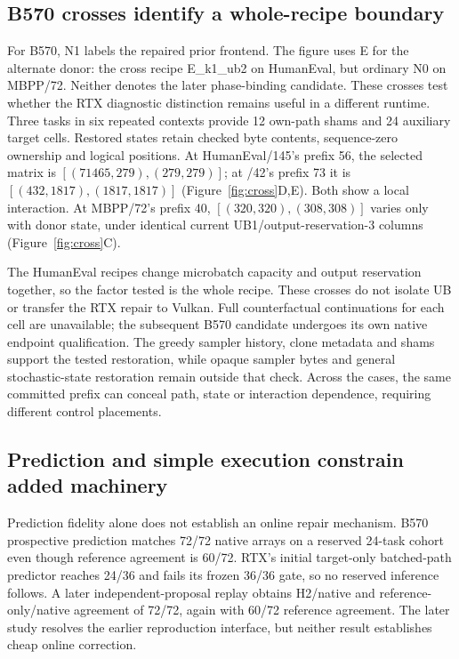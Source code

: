 \subsection{B570 crosses identify a whole-recipe boundary}
For B570, N1 labels the repaired prior frontend. The figure uses E for the alternate donor: the cross recipe E\_k1\_ub2 on HumanEval, but ordinary N0 on MBPP/72. Neither denotes the later phase-binding candidate. These crosses test whether the RTX diagnostic distinction remains useful in a different runtime. Three tasks in six repeated contexts provide 12 own-path shams and 24 auxiliary target cells. Restored states retain checked byte contents, sequence-zero ownership and logical positions. At HumanEval/145's prefix 56, the selected matrix is $[(71465,279),(279,279)]$; at /42's prefix 73 it is $[(432,1817),(1817,1817)]$ (Figure~\ref{fig:cross}D,E). Both show a local interaction. At MBPP/72's prefix 40, $[(320,320),(308,308)]$ varies only with donor state, under identical current UB1/output-reservation-3 columns (Figure~\ref{fig:cross}C).

The HumanEval recipes change microbatch capacity and output reservation together, so the factor tested is the whole recipe. These crosses do not isolate UB or transfer the RTX repair to Vulkan. Full counterfactual continuations for each cell are unavailable; the subsequent B570 candidate undergoes its own native endpoint qualification. The greedy sampler history, clone metadata and shams support the tested restoration, while opaque sampler bytes and general stochastic-state restoration remain outside that check. Across the cases, the same committed prefix can conceal path, state or interaction dependence, requiring different control placements.

\subsection{Prediction and simple execution constrain added machinery}
Prediction fidelity alone does not establish an online repair mechanism. B570 prospective prediction matches 72/72 native arrays on a reserved 24-task cohort even though reference agreement is 60/72. RTX's initial target-only batched-path predictor reaches 24/36 and fails its frozen 36/36 gate, so no reserved inference follows. A later independent-proposal replay obtains H2/native and reference-only/native agreement of 72/72, again with 60/72 reference agreement. The later study resolves the earlier reproduction interface, but neither result establishes cheap online correction.

